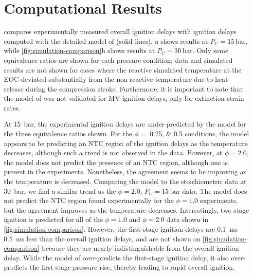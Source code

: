 \documentclass[letterpaper, review, sort&compress]{elsarticle}
\begin{document}
\section{Computational Results}\label{sec:computational-results}

 compares experimentally measured overall ignition delays with
ignition delays computed with the detailed model of \citet{Dievart2013} (solid lines).
a shows results at \(P_C = \SI{15}{\bar}\), while
\cref{fig:simulation-comparison}b shows results at \(P_C = \SI{30}{\bar}\). Only some equivalence
ratios are shown for each pressure condition; data and simulated results are not shown for cases
where the reactive simulated temperature at the EOC deviated substantially from the non-reactive
temperature due to heat release during the compression stroke. Furthermore, it is important to note
that the model of \citet{Dievart2013} was not validated for MV ignition delays, only for extinction
strain rates.

\begin{center}
    \captionsetup{type=figure}
    \resizebox{\textwidth}{!}{}
    \caption{Comparison of experimental and simulated results. a) \SI{15}{\bar}; b) \SI{30}{\bar}}
    \label{fig:simulation-comparison}
\end{center}

At \SI{15}{\bar}, the experimental ignition delays are under-predicted by the \citet{Dievart2013}
model for the three equivalence ratios shown. For the \(\phi =\) \numlist{0.25;0.5} conditions, the
model appears to be predicting an NTC region of the ignition delays as the temperature decreases,
although such a trend is not observed in the data. However, at \(\phi = 2.0\), the model does not
predict the presence of an NTC region, although one is present in the experiments. Nonetheless, the
agreement seems to be improving as the temperature is decreased. Comparing the \citet{Dievart2013}
model to the stoichiometric data at \SI{30}{\bar}, we find a similar trend as the \(\phi=2.0,\
P_C=\SI{15}{\bar}\) data. The model does not predict the NTC region found experimentally for the
\(\phi = 1.0\) experiments, but the agreement improves as the temperature decreases. Interestingly,
two-stage ignition is predicted for all of the \(\phi=1.0\) and \(\phi=2.0\) data shown in
\cref{fig:simulation-comparison}. However, the first-stage ignition delays are
\SIrange{0.1}{0.5}{\ms} less than the overall ignition delays, and are not shown on
\cref{fig:simulation-comparison} because they are nearly indistinguishable from the overall ignition
delay. While the model of \citet{Dievart2013} over-predicts the first-stage ignition delay, it also
over-predicts the first-stage pressure rise, thereby leading to rapid overall ignition.
\end{document}
